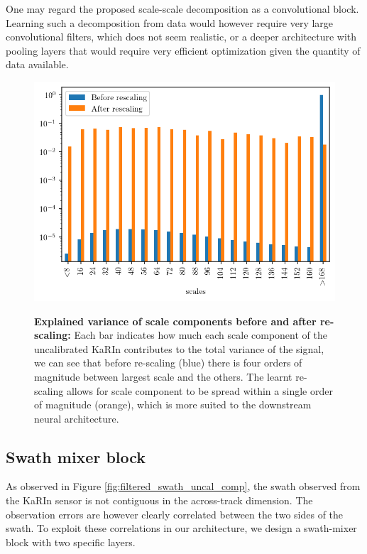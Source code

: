 \begin{bibunit}
One may regard the proposed scale-scale decomposition as a convolutional block. Learning such a decomposition from data would however require very large convolutional filters, which does not seem 
realistic, or a deeper architecture with pooling layers that would require very efficient optimization given the quantity of data available. 
\begin{figure}[!t]%
    \centering
    {\includegraphics[width=\linewidth]{00_Calib/var_rescale_obs} }%
    \caption{\textbf{Explained variance of scale components before and after re-scaling:} Each bar indicates how much each scale component of the uncalibrated KaRIn contributes to the total variance of the signal, we can see that before re-scaling (blue) there is four orders of magnitude between largest scale and the others. The learnt re-scaling allows for scale component to be spread within a single order of magnitude (orange), which is more suited to the downstream neural architecture.}%
    \label{fig:var_in_out}%
\end{figure}


\subsection{Swath mixer block}
\label{subsec:mixing}

As observed in Figure \ref{fig:filtered_swath_uncal_comp}, the swath observed from the KaRIn sensor is not contiguous in the across-track dimension. The observation errors are however clearly correlated between the two sides of the swath. To exploit these correlations in our architecture, we design a swath-mixer block with two specific layers. 


\end{bibunit}
